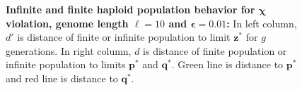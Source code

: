 \begin{figure}[ht]
\begin{center}
\hspace{-3em}%
\vspace{-0.5em} \hspace{-3em}%

\caption[\textbf{Infinite and finite haploid population behavior for $\bm{\chi}$ violation, genome length $\ell = 10$ and $\bm{\epsilon} = 0.01$}]{\textbf{Infinite and finite haploid population behavior for $\bm{\chi}$ violation, genome length $\ell = 10$ and $\bm{\epsilon} = 0.01$:} 
  In left column, $d'$ is distance of finite or infinite population to limit $\bm{z}^\ast$ for $g$ generations. In right column, $d$ is distance of finite population or infinite population to limits $\bm{p}^\ast$ and $\bm{q}^\ast$. Green line is distance to $\bm{p}^\ast$ and red line is distance to $\bm{q}^\ast$.}
\label{oscillation_10h_vio_chi_0.01}
\end{center}
\end{figure}


